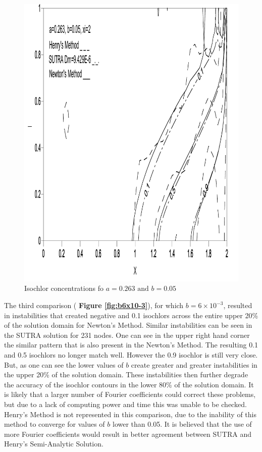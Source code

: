 \documentclass{article}
\newcommand{\spbox}[1]{ \text{ #1 }} %
\begin{document}
\begin{figure}[htp]
    \centering
    \includegraphics[totalheight=0.45 \textheight,viewport=3mm 4mm 205mm 292mm]
    {image3}
    \caption{Isochlor concentrations fo $a = 0.263 \spbox{and} b =
    0.05$} \label{fig:b5x10-2}
\end{figure}

The third comparison ( \textbf{Figure \ref{fig:b6x10-3}}), for which $b=6\times
10^{-3} $, resulted in instabilities that created negative and 0.1 isochlors
across the entire upper 20\% of the solution domain for Newton's Method. Similar
instabilities can be seen in the SUTRA solution for 231 nodes. One can see in
the upper right hand corner the similar pattern that is also present in the
Newton's Method. The resulting 0.1 and 0.5 isochlors no longer match well.
However the 0.9 isochlor is still very close. But, as one can see the lower
values of $b$ create greater and greater instabilities in the upper 20\% of the
solution domain. These instabilities then further degrade the accuracy of the
isochlor contours in the lower 80\% of the solution domain. It is likely that a
larger number of Fourier coefficients could correct these problems, but due to a
lack of computing power and time this was unable to be checked. Henry's Method
is not represented in this comparison, due to the inability of this method to
converge for values of $b$ lower than 0.05. It is believed that the use of more
Fourier coefficients would result in better agreement between SUTRA and Henry's
Semi-Analytic Solution.
\end{document}
